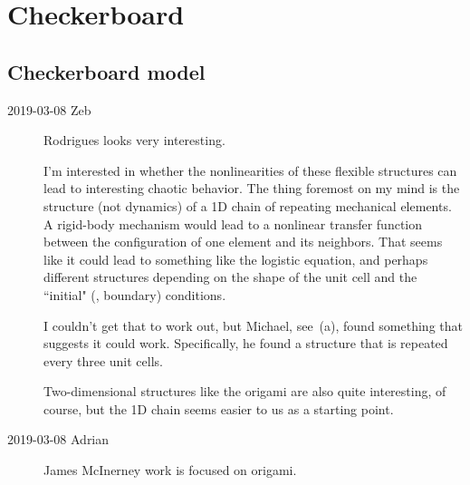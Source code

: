 \chapter{Checkerboard}
\label{c-checkers}


\section{Checkerboard model}
\label{sect:checkers}

\begin{description}

    \item[2019-03-08 Zeb]
Rodrigues \etal{} looks very interesting.

I'm interested in whether the nonlinearities of these
flexible structures can lead to interesting chaotic behavior. The thing
foremost on my mind is the structure (not dynamics) of a 1D chain of
repeating mechanical elements. A rigid-body mechanism would lead to a
nonlinear transfer function between the configuration of one element and
its neighbors. That seems like it could lead to something like the
logistic equation, and perhaps different structures depending on the
shape of the unit cell and the ``initial" (\ie, boundary) conditions.

I couldn't get that to work out, but Michael, see
\,(a), found something that suggests it could
work. Specifically, he found a structure that is repeated every three
unit cells.

Two-dimensional structures like the origami are also quite interesting,
of course, but the 1D chain seems easier to us as a starting point.

    \item[2019-03-08 Adrian]
James McInerney work is focused on origami.



\end{description}
